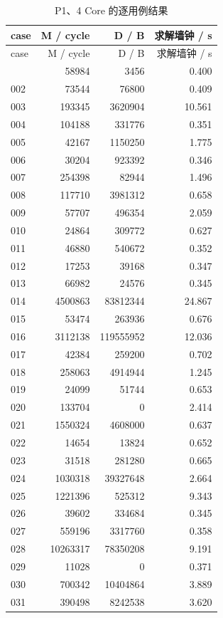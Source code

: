 \documentclass[anonymous,notoc]{gmcm2026}
\begin{document}
\begin{longtable}{lrrr}
\caption{P1、4 Core 的逐用例结果}\\
\toprule
case & M / cycle & D / B & 求解墙钟 / s\\\midrule
\endfirsthead
\toprule
case & M / cycle & D / B & 求解墙钟 / s\\\midrule
\endhead
\bottomrule\endfoot
001 & 58984 & 3456 & 0.400 \\
002 & 73544 & 76800 & 0.409 \\
003 & 193345 & 3620904 & 10.561 \\
004 & 104188 & 331776 & 0.351 \\
005 & 42167 & 1150250 & 1.775 \\
006 & 30204 & 923392 & 0.346 \\
007 & 254398 & 82944 & 1.496 \\
008 & 117710 & 3981312 & 0.658 \\
009 & 57707 & 496354 & 2.059 \\
010 & 24864 & 309772 & 0.627 \\
011 & 46880 & 540672 & 0.352 \\
012 & 17253 & 39168 & 0.347 \\
013 & 66982 & 24576 & 0.345 \\
014 & 4500863 & 83812344 & 24.867 \\
015 & 53474 & 263936 & 0.676 \\
016 & 3112138 & 119555952 & 12.036 \\
017 & 42384 & 259200 & 0.702 \\
018 & 258063 & 4914944 & 1.245 \\
019 & 24099 & 51744 & 0.653 \\
020 & 133704 & 0 & 2.414 \\
021 & 1550324 & 4608000 & 0.637 \\
022 & 14654 & 13824 & 0.652 \\
023 & 31518 & 281280 & 0.665 \\
024 & 1030318 & 39327648 & 2.664 \\
025 & 1221396 & 525312 & 9.343 \\
026 & 39602 & 334684 & 0.345 \\
027 & 559196 & 3317760 & 0.358 \\
028 & 10263317 & 78350208 & 9.191 \\
029 & 11028 & 0 & 0.371 \\
030 & 700342 & 10404864 & 3.889 \\
031 & 390498 & 8242538 & 3.620 \\

\end{longtable}
\end{document}

